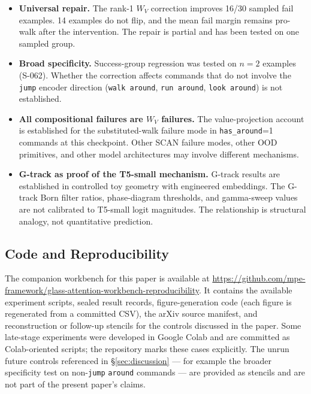 \begin{itemize}
  \item \textbf{Universal repair.}
    The rank-1 $W_V$ correction improves 16/30 sampled fail examples.
    14 examples do not flip, and the mean fail margin remains pro-walk after the
    intervention.
    The repair is partial and has been tested on one sampled group.

  \item \textbf{Broad specificity.}
    Success-group regression was tested on $n=2$ examples (S-062).
    Whether the correction affects commands that do not involve the \texttt{jump}
    encoder direction (\texttt{walk around}, \texttt{run around}, \texttt{look around})
    is not established.

  \item \textbf{All compositional failures are $W_V$ failures.}
    The value-projection account is established for the substituted-walk failure mode
    in \texttt{has\_around}=1 commands at this checkpoint.
    Other SCAN failure modes, other OOD primitives, and other model architectures
    may involve different mechanisms.

  \item \textbf{G-track as proof of the T5-small mechanism.}
    G-track results are established in controlled toy geometry with engineered
    embeddings.
    The G-track Born filter ratios, phase-diagram thresholds, and gamma-sweep values
    are not calibrated to T5-small logit magnitudes.
    The relationship is structural analogy, not quantitative prediction.
\end{itemize}

\subsection{Code and Reproducibility}

The companion workbench for this paper is available at
\url{https://github.com/mpe-framework/glass-attention-workbench-reproducibility}.
It contains the available experiment scripts, sealed result records, figure-generation
code (each figure is regenerated from a committed CSV), the arXiv source manifest,
and reconstruction or follow-up stencils for the controls discussed in the paper.
Some late-stage experiments were developed in Google Colab and are committed as
Colab-oriented scripts; the repository marks these cases explicitly.
The unrun future controls referenced in \S\ref{sec:discussion} --- for example the
broader specificity test on non-\texttt{jump} \texttt{around} commands --- are provided
as stencils and are not part of the present paper's claims.
